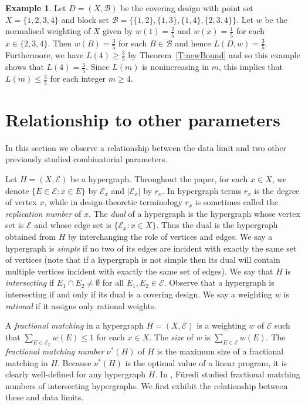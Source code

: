 \documentclass[11pt]{article}
\theoremstyle{definition}
\newtheorem{Example}[Theorem]{Example}
\renewcommand{\leq}{\leqslant}
\renewcommand{\geq}{\geqslant}
\newcommand{\B}{{\ensuremath{\mathcal{B}}}}
\newcommand{\E}{\mathcal{E}}
\begin{document}
\begin{Example}\label{X:order4}
Let $D=(X,\B)$ be the covering design with point set $X=\{1,2,3,4\}$ and block set $\B=\{\{1,2\},\{1,3\},\{1,4\},\{2,3,4\}\}$. Let $w$ be the normalised weighting of $X$ given by $w(1)=\frac{2}{5}$ and $w(x)=\frac{1}{5}$ for each $x \in \{2,3,4\}$. Then $w(B)=\frac{3}{5}$ for each $B \in \B$ and hence $L(D,w)=\frac{3}{5}$. Furthermore, we have $L(4) \geq \frac{3}{5}$ by Theorem~\ref{T:newBound} and so this example shows that $L(4)=\frac{3}{5}$. Since $L(m)$ is nonincreasing in $m$, this implies that $L(m) \leq \frac{3}{5}$ for each integer $m \geq 4$.
\end{Example}






\section{Relationship to other parameters}\label{S:relat}

In this section we observe a relationship between the data limit and two other previously studied combinatorial parameters.

Let $H=(X,\mathcal{E})$ be a hypergraph. Throughout the paper, for each $x \in X$, we denote $\{E \in \mathcal{E}:x \in E\}$ by $\mathcal{E}_x$ and $|\E_x|$ by $r_x$. In hypergraph terms $r_x$ is the degree of vertex $x$, while in design-theoretic terminology $r_x$ is sometimes called the \emph{replication number} of $x$. The \emph{dual} of a hypergraph  is the hypergraph whose vertex set is $\mathcal{E}$ and whose edge set is $\{\mathcal{E}_x:x \in X\}$. Thus the dual is the hypergraph obtained from $H$ by interchanging the role of vertices and edges. We say a hypergraph is \emph{simple} if no two of its edges are incident with exactly the same set of vertices (note that if a hypergraph is not simple then its dual will contain multiple vertices incident with exactly the same set of edges). We say that $H$ is \emph{intersecting} if $E_1 \cap E_2 \neq \emptyset$ for all $E_1,E_2 \in \mathcal{E}$. Observe that a hypergraph is intersecting if and only if its dual is a covering design. We say a weighting $w$ is \emph{rational} if it assigns only rational weights.

A \emph{fractional matching} in a hypergraph $H=(X,\E)$ is a weighting $w$ of $\E$ such that $\sum_{E \in \E_x}w(E) \leq 1$ for each $x \in X$. The \emph{size} of $w$ is $\sum_{E \in \E}w(E)$. The \emph{fractional matching number} $\nu^*(H)$ of $H$ is the maximum size of a fractional matching in $H$. Because $\nu^*(H)$ is the optimal value of a linear program, it is clearly well-defined for any hypergraph $H$. In \cite{Fur}, F{\"u}redi studied fractional matching numbers of intersecting hypergraphs. We first exhibit the relationship between these and data limits.\pagebreak
\end{document}
